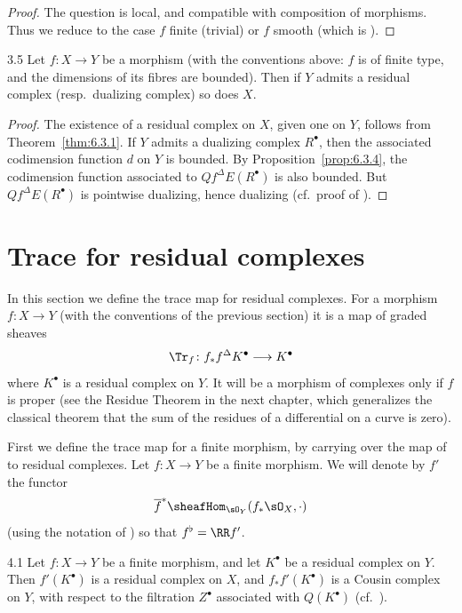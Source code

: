 \begin{proof}
The question is local, and compatible with composition of morphisms. Thus we reduce to the case $f$ finite (trivial) or $f$ smooth (which is ).
\end{proof}

\begin{bookcorollary}{3.5}\label{cor:6.3.5}
Let $f\colon X\to Y$ be a morphism (with the conventions above: $f$ is of finite type, and the dimensions of its fibres are bounded). Then if $Y$ admits a residual complex (resp.\ dualizing complex) so does $X$.
\end{bookcorollary}

\begin{proof}
The existence of a residual complex on $X$, given one on $Y$, follows from Theorem~\ref{thm:6.3.1}. If $Y$ admits a dualizing complex $R^\bullet$, then the associated codimension function $d$ on $Y$ is bounded. By Proposition~\ref{prop:6.3.4}, the codimension function associated to $Qf^{\Delta}E(R^\bullet)$ is also bounded. But $Qf^{\Delta}E(R^\bullet)$ is pointwise dualizing, hence dualizing (cf.\ proof of ).
\end{proof}

\section{Trace for residual complexes}\label{sec:6.4}

In this section we define the trace map for residual complexes. For a morphism $f\colon X\to Y$ (with the conventions of the previous section) it is a map of graded sheaves
\[
\Tr_f\colon f_*f^{\Delta}K^\bullet \longrightarrow K^\bullet
\]
where $K^\bullet$ is a residual complex on $Y$. It will be a morphism of complexes only if $f$ is proper (see the Residue Theorem in the next chapter, which generalizes the classical theorem that the sum of the residues of a differential on a curve is zero).

First we define the trace map for a finite morphism, by carrying over the map of  to residual complexes. Let $f\colon X\to Y$ be a finite morphism. We will denote by $f'$ the functor
\[
\overline{f}^{*}\sheafHom_{\sO_Y}(f_*\sO_X,\cdot)
\]
(using the notation of ) so that $f^{\flat} = \RR f'$.

\begin{booklemma}{4.1}\label{lem:6.4.1}
Let $f\colon X\to Y$ be a finite morphism, and let $K^\bullet$ be a residual complex on $Y$. Then $f'(K^\bullet)$ is a residual complex on $X$, and $f_*f'(K^\bullet)$ is a Cousin complex on $Y$, with respect to the filtration $Z^\bullet$ associated with $Q(K^\bullet)$ (cf.\ ).
\end{booklemma}

